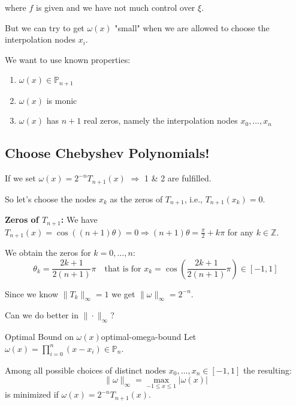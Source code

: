 where $f$ is given and we have not much control over $\xi$.

But we can try to get $\omega(x)$ "small" when we are allowed to choose the interpolation nodes $x_i$.

We want to use known properties:
\begin{enumerate}
    \item $\omega(x) \in \mathbb{P}_{n+1}$
    \item $\omega(x)$ is monic
    \item $\omega(x)$ has $n+1$ real zeros, namely the interpolation nodes $x_0, \ldots, x_n$
\end{enumerate}

\subsection{Choose Chebyshev Polynomials!}

If we set $\omega(x) = 2^{-n}T_{n+1}(x)$ $\Rightarrow$ 1 \& 2 are fulfilled.

So let's choose the nodes $x_k$ as the zeros of $T_{n+1}$, i.e., $T_{n+1}(x_k) = 0$.

\textbf{Zeros of $T_{n+1}$:} We have $T_{n+1}(x) = \cos((n+1)\theta) = 0 \Rightarrow (n+1)\theta = \frac{\pi}{2} + k\pi$ for any $k \in \mathbb{Z}$.

We obtain the zeros for $k = 0, \ldots, n$:
\[\theta_k = \frac{2k+1}{2(n+1)} \pi \quad \text{that is for } x_k = \cos\left(\frac{2k+1}{2(n+1)} \pi\right) \in [-1,1]\]

Since we know $\|T_k\|_{\infty} = 1$ we get $\|\omega\|_{\infty} = 2^{-n}$.

Can we do better in $\|\cdot\|_{\infty}$?

\begin{theorem}{Optimal Bound on $\omega(x)$}{optimal-omega-bound}
    Let $\omega(x) = \prod_{i=0}^n (x - x_i) \in \mathbb{P}_n$.

    Among all possible choices of distinct nodes $x_0, \ldots, x_n \in [-1,1]$ the resulting:
    \[\|\omega\|_{\infty} = \max_{-1 \leq x \leq 1} |\omega(x)|\]
    is minimized if $\omega(x) = 2^{-n}T_{n+1}(x)$.
\end{theorem}

